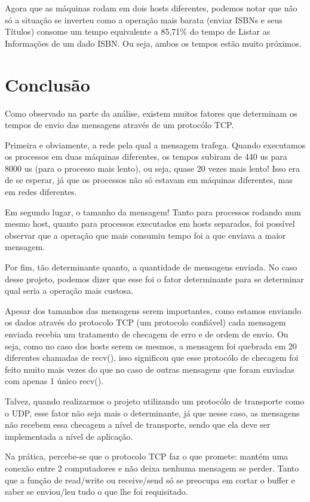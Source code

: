 \documentclass[10pt,a4paper]{report}
\begin{document}
	Agora que as máquinas rodam em dois hosts diferentes, podemos notar que não só a situação se inverteu como a operação mais barata (enviar ISBNs e seus Títulos) consome um tempo equivalente a 85,71\% do tempo de Listar as Informações de um dado ISBN. Ou seja, ambos os tempos estão muito próximos.
	
\chapter{Conclusão}
Como observado na parte da análise, existem muitos fatores que determinam os tempos de envio das mensagens através de um protocólo TCP.

	Primeira e obviamente, a rede pela qual a mensagem trafega. Quando executamos os processos em duas máquinas diferentes, os tempos subiram de 440 us para 8000 us (para o processo mais lento), ou seja, quase 20 vezes mais lento! Isso era de se esperar, já que os processos não só estavam em máquinas diferentes, mas em redes diferentes.
	
	Em segundo lugar, o tamanho da mensagem! Tanto para processos rodando num mesmo host, quanto para processos executados em hosts separados, foi possível observar que a operação que mais consumiu tempo foi a que enviava a maior mensagem.
	
	Por fim, tão determinante quanto, a quantidade de mensagens enviada. No caso desse projeto, podemos dizer que esse foi o fator determinante para se determinar qual seria a operação mais custosa.
	
	Apesar dos tamanhos das mensagens serem importantes, como estamos enviando os dados através do protocolo TCP (um protocolo confiável) cada mensagem enviada recebia um tratamento de checagem de erro e de ordem de envio. Ou seja, como no caso dos hosts serem os mesmos, a mensagem foi quebrada em 20 diferentes chamadas de recv(), isso significou que esse protocólo de checagem foi feito muito mais vezes do que no caso de outras mensagens que foram enviadas com apenas 1 único recv().
	
	Talvez, quando realizarmos o projeto utilizando um protocólo de transporte como o UDP, esse fator não seja mais o determinante, já que nesse caso, as mensagens não recebem essa checagem a nível de transporte, sendo que ela deve ser implementada a nível de aplicação.
	
Na prática, percebe-se que o protocolo TCP faz o que promete: mantém uma conexão entre 2 computadores e não deixa nenhuma mensagem se perder. Tanto que a função de read/write ou receive/send só se preocupa em cortar o buffer e saber se enviou/leu tudo o que lhe foi requisitado.
\end{document}
